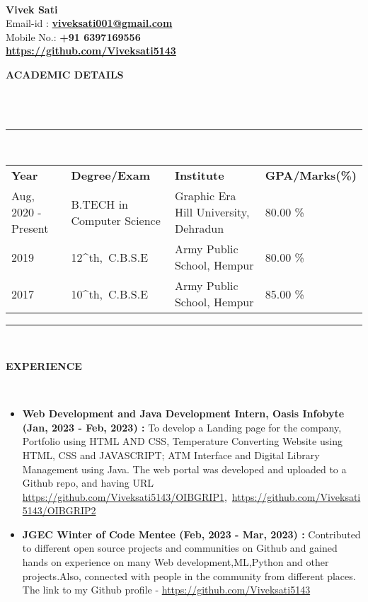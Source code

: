 \documentclass[a4paper,10pt]{article}
\newcommand{\lsep}{-0.5cm}
\newcommand{\resheading}[1]{{\small \colorbox{mygrey}{\begin{minipage}{0.975\textwidth}{\textbf{#1 \vphantom{p\^{E}}}}\end{minipage}}}}
\begin{document}
\hspace{0.5cm}\\[-0.2cm]

\textbf{Vivek Sati} \\
\indent Email-id : \textbf{\url{viveksati001@gmail.com}} \\
\indent Mobile No.: \textbf{+91 6397169556} \ \\
\indent \textbf{\url{https://github.com/Viveksati5143}}\\

\resheading{\textbf{ACADEMIC DETAILS} }\\[\lsep]
\\
\indent \rule{6.8in}{0.4pt}\\
\indent \begin{tabular}{ l @{\hskip 0.15in} l @{\hskip 0.15in} l @{\hskip 0.15in} l @{\hskip 0.15in} }
\noindent \textbf{Year} & \textbf{Degree/Exam} & \textbf{Institute} & \textbf{GPA/Marks(\%)}\\
Aug, 2020 - Present & B.TECH in Computer Science & Graphic Era Hill University, Dehradun & 80.00 \% \\
2019 & 12^{th},\ C.B.S.E & Army Public School, Hempur & 80.00 \% \\
2017 & 10^{th},\ C.B.S.E & Army Public School, Hempur & 85.00 \%\\

\end{tabular}
\indent \rule{6.8in}{0.4pt}
\\

\resheading{\textbf{EXPERIENCE} }\\[\lsep]
\begin{itemize}
\setlength\itemsep{0.5em}
\item \textbf{Web Development and Java Development Intern, Oasis Infobyte (Jan, 2023 - Feb, 2023) : }To develop
a Landing page for the company, Portfolio using HTML AND CSS, Temperature Converting Website using HTML, CSS and JAVASCRIPT; ATM Interface and Digital Library Management using Java.
The web portal was developed and uploaded to a Github repo, and having URL \url{https://github.com/Viveksati5143/OIBGRIP1},\ \url{https://github.com/Viveksati5143/OIBGRIP2}
\item \textbf{JGEC Winter of Code Mentee (Feb, 2023 - Mar, 2023) : }Contributed to different open source projects and communities on Github and gained hands on experience on many Web development,ML,Python and other projects.Also, connected with people in the community from different places.
The link to my Github profile - 
\url{https://github.com/Viveksati5143}
\end{itemize}
\end{document}
